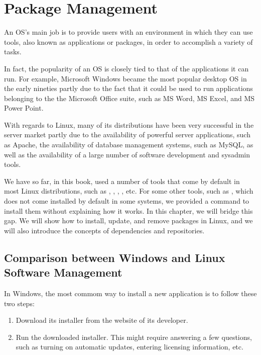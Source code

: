 \chapter{Package Management}\label{ch:packages}

An \acs{OS}’s main job is to provide users with an environment in which they can use tools, also known as applications or packages, in order to accomplish a variety of tasks.

In fact, the popularity of an \acs{OS} is closely tied to that of the applications it can run. For example, Microsoft Windows became the most popular desktop \acs{OS} in the early nineties partly due to the fact that it could be used to run applications belonging to the the Microsoft Office suite, such as MS Word, MS Excel, and MS Power Point.

With regards to Linux, many of its distributions have been very successful in the server market partly due to the availability of powerful server applications, such as Apache, the availability of database
management systems, such as MySQL, as well as the availability of a large number of software development and sysadmin tools.


We have so far, in this book, used a number of tools that come
by default in most Linux distributions, such as , , , , etc. For some other tools, such as , which does not come installed by default in some systems, we provided a command to install them without explaining how it works. In this chapter, we will bridge this gap. We will show how to install, update, and remove packages in Linux, and we will also introduce the concepts of dependencies and repositories.

\section{Comparison between Windows and Linux Software Management}

In Windows, the most commom way to install a new application is to follow these two steps:
\begin{enumerate}
\item Download its installer from the website of its developer.
\item Run the downloaded installer. This might require answering a few questions, such as turning on automatic updates, entering licensing information, etc.
\end{enumerate}

